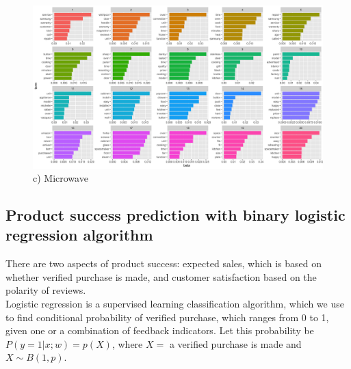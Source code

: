 \documentclass[reqno]{article}
\theoremstyle{definition}
\theoremstyle{definition}
\theoremstyle{remark}
\begin{document}
\begin{figure}{\textwidth}
\begin{center}
    \includegraphics[width= \linewidth]{microwave_top_terms.png}
    c) Microwave
    \end{center}
\end{figure}
\clearpage
\subsection{Product success prediction with binary logistic regression algorithm}
There are two aspects of product success: expected sales, which is based on whether verified purchase is made, and customer satisfaction based on the polarity of reviews. \\
Logistic regression is a supervised learning classification algorithm, which we use to find conditional probability of verified purchase, which ranges from 0 to 1, given one or a combination of feedback indicators. 
Let this probability be $P(y=1|x;w) = p(X)$, where $X = $ a verified purchase is made and $X \sim B(1, p)$.
\end{document}
